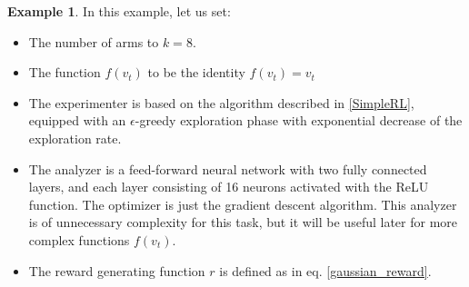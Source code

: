 \documentclass[11pt,a4paper,twoside]{report}
\newcommand{\+}{\textnormal{+} }
\theoremstyle{definition}
\newtheorem{myex}[mythm]{Example}
\numberwithin{equation}{chapter}
\begin{document}
\begin{myex}
    In this example, let us set:

    \begin{itemize}
      \item The number of arms to $k=8$.
      \item The function $f(v_t)$ to be the identity $f(v_t)=v_t$
      \item The experimenter is based on the algorithm described in
      \ref{SimpleRL}, equipped with an $\epsilon$-greedy exploration phase with
      exponential decrease of the exploration rate. 
      \item The analyzer is a feed-forward neural network with two fully
      connected layers, and each layer consisting of 16  neurons activated with
      the ReLU function. The optimizer is just the gradient descent algorithm.
      This analyzer is of unnecessary complexity for this task, but it will be
      useful later for more complex functions $f(v_t)$.
      \item The reward generating function $r$ is defined as in eq.
      \eqref{gaussian_reward}.
    \end{itemize}


\end{myex}
\end{document}
